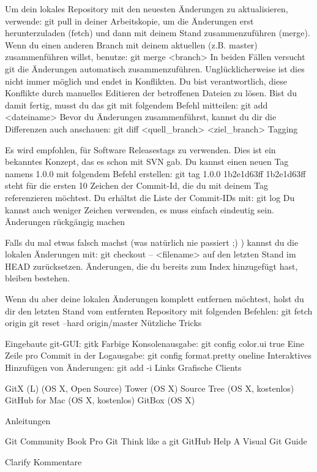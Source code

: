 \documentclass[11pt]{article}
\begin{document}
Um dein lokales Repository mit den neuesten Änderungen zu aktualisieren, verwende:
git pull
in deiner Arbeitskopie, um die Änderungen erst herunterzuladen (fetch) und dann mit deinem Stand zusammenzuführen (merge).
Wenn du einen anderen Branch mit deinem aktuellen (z.B. master) zusammenführen willst, benutze:
git merge <branch>
In beiden Fällen versucht git die Änderungen automatisch zusammenzuführen. Unglücklicherweise ist dies nicht immer möglich und endet in Konflikten. Du bist verantwortlich, diese Konflikte durch manuelles Editieren der betroffenen Dateien zu lösen. Bist du damit fertig, musst du das git mit folgendem Befehl mitteilen:
git add <dateiname>
Bevor du Änderungen zusammenführst, kannst du dir die Differenzen auch anschauen:
git diff <quell\_branch> <ziel\_branch>
Tagging

Es wird empfohlen, für Software Releasestags zu verwenden. Dies ist ein bekanntes Konzept, das es schon mit SVN gab. Du kannst einen neuen Tag namens 1.0.0 mit folgendem Befehl erstellen:
git tag 1.0.0 1b2e1d63ff
1b2e1d63ff steht für die ersten 10 Zeichen der Commit-Id, die du mit deinem Tag referenzieren möchtest. Du erhältst die Liste der Commit-IDs mit:
git log
Du kannst auch weniger Zeichen verwenden, es muss einfach eindeutig sein.
Änderungen rückgängig machen

Falls du mal etwas falsch machst (was natürlich nie passiert ;) ) kannst du die lokalen Änderungen mit:
git checkout -- <filename>
auf den letzten Stand im HEAD zurücksetzen. Änderungen, die du bereits zum Index hinzugefügt hast, bleiben bestehen.

Wenn du aber deine lokalen Änderungen komplett entfernen möchtest, holst du dir den letzten Stand vom entfernten Repository mit folgenden Befehlen:
git fetch origin
git reset --hard origin/master
Nützliche Tricks

Eingebaute git-GUI:
gitk
Farbige Konsolenausgabe:
git config color.ui true
Eine Zeile pro Commit in der Logausgabe:
git config format.pretty oneline
Interaktives Hinzufügen von Änderungen:
git add -i
Links
Grafische Clients

    GitX (L) (OS X, Open Source)
    Tower (OS X)
    Source Tree (OS X, kostenlos)
    GitHub for Mac (OS X, kostenlos)
    GitBox (OS X)

Anleitungen

    Git Community Book
    Pro Git
    Think like a git
    GitHub Help
    A Visual Git Guide

Clarify
Kommentare
\end{document}
